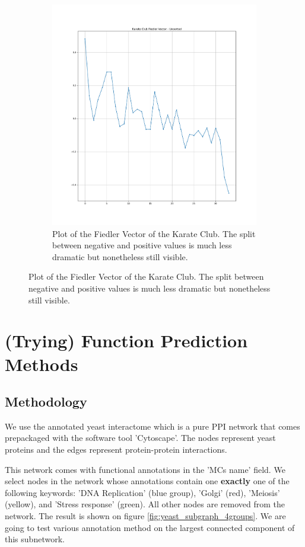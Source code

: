 \documentclass[a4paper,10pt]{article}
\theoremstyle{definition}
\theoremstyle{remark}
\theoremstyle{plain}
\begin{document}
\begin{figure}
\begin{subfigure}[b]{0.5\textwidth}
\includegraphics[width=\textwidth]{karate_fiedler_unsorted.png}
\caption{Plot of the Fiedler Vector of the Karate Club. The split between
negative and positive values is much less dramatic but nonetheless still visible.}
\label{fig:karatefiedlerplot}
\end{subfigure}
\end{figure}

\section{(Trying) Function Prediction Methods}

\subsection{Methodology}
We use the annotated yeast interactome which is a pure PPI network that comes
prepackaged with the
software tool 'Cytoscape'. The nodes represent yeast proteins and the edges
represent protein-protein interactions.

This network comes with functional annotations in the 'MCs name' field. We
select nodes in the network whose annotations contain one \textbf{exactly} one
of the following
keywords:  'DNA Replication' (blue group), 'Golgi' (red), 'Meiosis' (yellow),
and 'Stress response' (green). All other nodes are removed from the network.
The result is shown on figure \ref{fig:yeast_subgraph_4groups}. We are going to
test various annotation method on the largest connected component of this
subnetwork.
\end{document}
